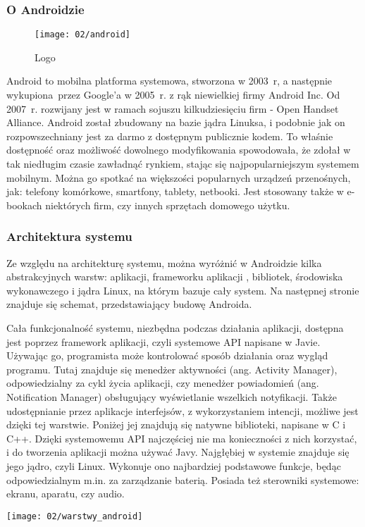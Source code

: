 \subsubsection*{O Androidzie}
\begin{wrapfigure}[9]{l}{0.25\textwidth}
	\vspace{-15pt}
	\begin{center}
		\texttt{[image: 02/android]}
	\end{center}
	\vspace{-10pt}
	\caption{Logo}
	\vspace{-10pt}
\end{wrapfigure}
Android to mobilna platforma systemowa, stworzona w 2003~r, a następnie wykupiona przez Google'a w 2005~r. z rąk niewielkiej firmy Android Inc. Od 2007~r. rozwijany jest w ramach sojuszu kilkudziesięciu firm - Open Handset Alliance. Android został zbudowany na bazie jądra Linuksa, i podobnie jak on rozpowszechniany jest za darmo z dostępnym publicznie kodem. To właśnie dostępność oraz możliwość dowolnego modyfikowania spowodowała, że zdołał w tak niedługim czasie zawładnąć rynkiem, stając się najpopularniejszym systemem mobilnym. Można go spotkać na większości popularnych urządzeń przenośnych, jak: telefony komórkowe, smartfony, tablety, netbooki. Jest stosowany także w e-bookach niektórych firm, czy innych sprzętach domowego użytku. 


\subsubsection*{Architektura systemu}
Ze względu na architekturę systemu, można wyróżnić w Androidzie kilka abstrakcyjnych warstw: aplikacji, frameworku aplikacji , bibliotek, środowiska wykonawczego i jądra Linux, na którym bazuje cały system. Na następnej stronie znajduje się schemat, przedstawiający budowę Androida.

Cała funkcjonalność systemu, niezbędna podczas działania aplikacji, dostępna jest poprzez framework aplikacji, czyli systemowe API napisane w Javie. Używając go, programista może kontrolować sposób działania oraz wygląd programu. Tutaj znajduje się menedżer aktywności (ang. Activity Manager), odpowiedzialny za cykl życia aplikacji, czy menedżer powiadomień (ang. Notification Manager) obsługujący wyświetlanie wszelkich notyfikacji. Także udostępnianie przez aplikacje interfejsów, z wykorzystaniem intencji, możliwe jest dzięki tej warstwie. Poniżej jej znajdują się natywne biblioteki, napisane w C i C++. Dzięki systemowemu API najczęściej nie ma konieczności z nich korzystać, i do tworzenia aplikacji można używać Javy. Najgłębiej w systemie znajduje się jego jądro, czyli Linux. Wykonuje ono najbardziej podstawowe funkcje, będąc odpowiedzialnym m.in. za zarządzanie baterią. Posiada też sterowniki systemowe: ekranu, aparatu, czy audio.
\begin{center}
	\texttt{[image: 02/warstwy\_android]}
\end{center}
